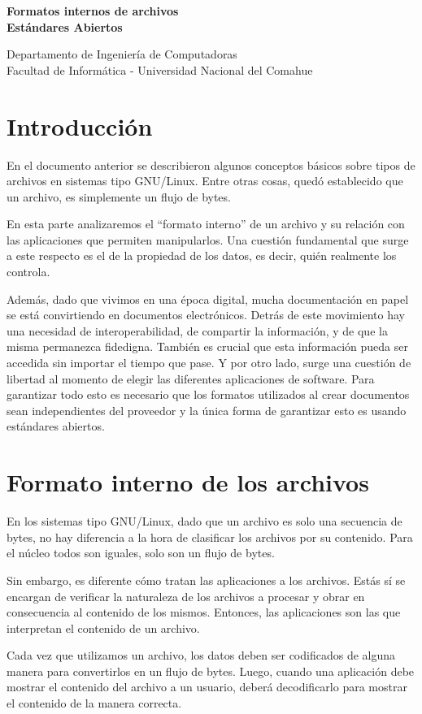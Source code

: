 \documentclass[12pt]{article}
\def\maketitle{

\makeatletter
{\color{bl} \centering \huge \sc \textbf{
Formatos internos de archivos\\
Estándares Abiertos\\
 \vspace*{8pt} }\par}
 \makeatother


 \makeatletter
 {\centering \small 
 	Departamento de Ingeniería de Computadoras \\
 	Facultad de Informática - Universidad Nacional del Comahue \\
 	\vspace{20pt} }
 \makeatother

}
\begin{document}
\thispagestyle{empty}
\maketitle
\setlength{\parindent}{0pt}


\section*{Introducción}
En el documento anterior se describieron algunos conceptos básicos sobre tipos de archivos en sistemas tipo GNU/Linux. Entre otras cosas, quedó establecido que un archivo, es simplemente un flujo de bytes.  

En esta parte analizaremos el ``formato interno'' de un archivo y su relación con las aplicaciones que permiten manipularlos. Una cuestión fundamental que surge a este respecto es el de la propiedad de los datos, es decir, quién realmente los controla. 

Además, dado que vivimos en una época digital, mucha documentación en papel se está convirtiendo en documentos electrónicos. Detrás de este movimiento hay una necesidad de interoperabilidad, de compartir la información, y de que la misma permanezca fidedigna. También es crucial que esta información pueda ser accedida sin importar el tiempo que pase. Y por otro lado, surge una cuestión de libertad al momento de elegir las diferentes aplicaciones de software. Para garantizar todo esto es necesario que los formatos utilizados al crear documentos sean independientes del proveedor y la única forma de garantizar esto es usando estándares abiertos. 

\section*{Formato interno de los archivos}

En los sistemas tipo GNU/Linux, dado que un archivo es solo una secuencia de bytes, no hay diferencia a la hora de clasificar los archivos por su contenido. Para el núcleo todos son iguales, solo son un flujo de bytes. 

Sin embargo, es diferente cómo tratan las aplicaciones a los archivos. Estás sí se encargan de verificar la naturaleza de los archivos a procesar y obrar en consecuencia al contenido de los mismos. Entonces, las aplicaciones son las que interpretan el contenido de un archivo.

Cada vez que utilizamos un archivo, los datos deben ser codificados de alguna manera para convertirlos en un flujo de bytes. Luego, cuando una aplicación debe mostrar el contenido del archivo a un usuario, deberá decodificarlo para mostrar el contenido de la manera correcta.
\end{document}

